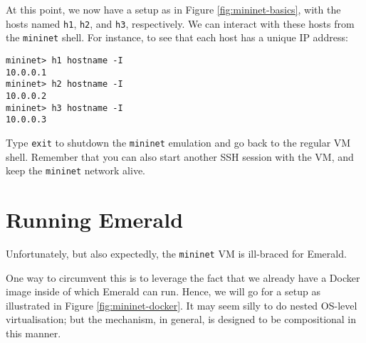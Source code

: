 \documentclass{article}
\newcommand{\mininet}{\texttt{mininet}}
\begin{document}
At this point, we now have a setup as in Figure
\ref{fig:mininet-basics}, with the hosts named \texttt{h1},
\texttt{h2}, and \texttt{h3}, respectively. We can interact with these
hosts from the \mininet{} shell. For instance, to see that each host
has a unique IP address:

\begin{lstlisting}
mininet> h1 hostname -I
10.0.0.1
mininet> h2 hostname -I
10.0.0.2
mininet> h3 hostname -I
10.0.0.3
\end{lstlisting}

Type \texttt{exit} to shutdown the \mininet{} emulation and go back to
the regular VM shell. Remember that you can also start another SSH
session with the VM, and keep the \mininet{} network alive. 

\section{Running Emerald}

\label{sec:emerald}

Unfortunately, but also expectedly, the \mininet{} VM is ill-braced for Emerald.

One way to circumvent this is to leverage the fact that we already
have a Docker image inside of which Emerald can run. Hence, we will go
for a setup as illustrated in Figure \ref{fig:mininet-docker}. It may
seem silly to do nested OS-level virtualisation; but the mechanism, in
general, is designed to be compositional in this manner.
\end{document}
